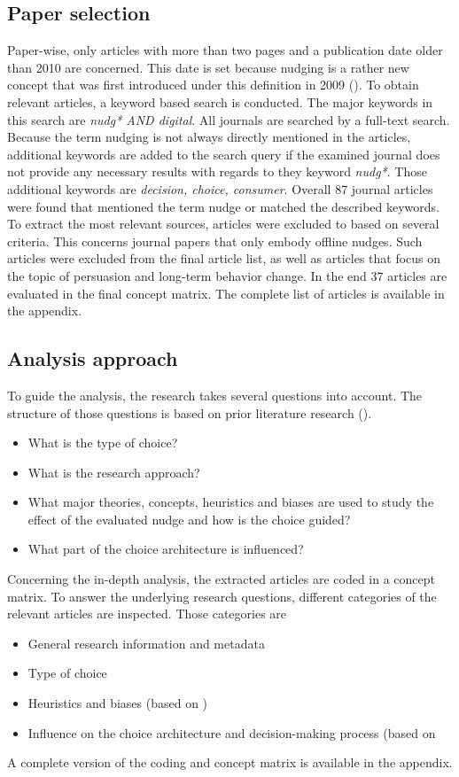 \subsection{Paper selection}
Paper-wise, only articles with more than two pages and a publication date older than 2010 are concerned. This date is set because nudging is a rather new concept that was first introduced under this definition in 2009 (\cite{thaler_nudge:_2009}). To obtain relevant articles, a keyword based search is conducted. The major keywords in this search are \textit{nudg* AND digital}. All journals are searched by a full-text search. Because the term nudging is not always directly mentioned in the articles, additional keywords are added to the search query if the examined journal does not provide any necessary results with regards to they keyword \textit{nudg*}. Those additional keywords are \textit{decision, choice, consumer}. Overall 87 journal articles were found that mentioned the term nudge or matched the described keywords. To extract the most relevant sources, articles were excluded to based on several criteria. This concerns journal papers that only embody offline nudges. Such articles were excluded from the final article list, as well as articles that focus on the topic of persuasion and long-term behavior change. In the end 37 articles are evaluated in the final concept matrix. The complete list of articles is available in the appendix.

\subsection{Analysis approach}
To guide the analysis, the research takes several questions into account. The structure of those questions is based on prior literature research (\cite{alavi_review_1992}).
\begin{itemize}
\item What is the type of choice?
\item What is the research approach?
\item What major theories, concepts, heuristics and biases are used to study the effect of the evaluated nudge and how is the choice guided?
\item What part of the choice architecture is influenced?
\end{itemize}

Concerning the in-depth analysis, the extracted articles are coded in a concept matrix. To answer the underlying research questions, different categories of the relevant articles are inspected. Those categories are 
\begin{itemize}
\item General research information and metadata
\item Type of choice
\item Heuristics and biases (based on \cite{schneider_digital_2018})
\item Influence on the choice architecture and decision-making process (based on \cite{munscher_review_2016}
\end{itemize}

A complete version of the coding and concept matrix is available in the appendix.